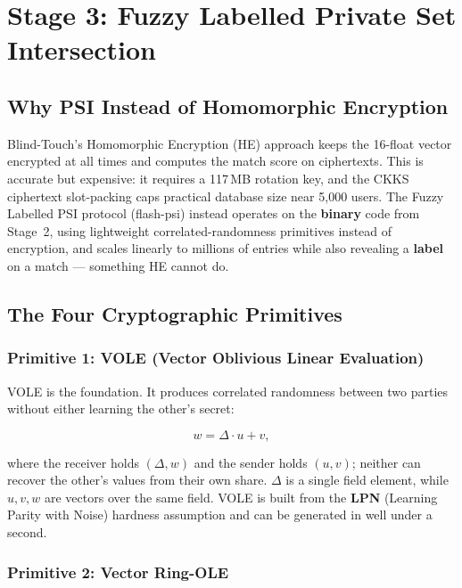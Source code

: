 \documentclass[11pt]{article}
\begin{document}
\section{Stage 3: Fuzzy Labelled Private Set Intersection}

\subsection{Why PSI Instead of Homomorphic Encryption}

Blind-Touch's Homomorphic Encryption (HE) approach keeps the 16-float vector encrypted at
all times and computes the match score on ciphertexts. This is accurate but expensive: it
requires a 117\,MB rotation key, and the CKKS ciphertext slot-packing caps practical
database size near 5{,}000 users. The Fuzzy Labelled PSI protocol (flash-psi) instead
operates on the \textbf{binary} code from Stage~2, using lightweight correlated-randomness
primitives instead of encryption, and scales linearly to millions of entries while also
revealing a \textbf{label} on a match --- something HE cannot do.

\subsection{The Four Cryptographic Primitives}

\subsubsection{Primitive 1: VOLE (Vector Oblivious Linear Evaluation)}

VOLE is the foundation. It produces correlated randomness between two parties without
either learning the other's secret:

\begin{equation}
w = \Delta \cdot u + v ,
\end{equation}

where the receiver holds $(\Delta, w)$ and the sender holds $(u, v)$; neither can recover
the other's values from their own share. $\Delta$ is a single field element, while $u,v,w$
are vectors over the same field. VOLE is built from the \textbf{LPN} (Learning Parity with
Noise) hardness assumption and can be generated in well under a second.

\subsubsection{Primitive 2: Vector Ring-OLE}
\end{document}
